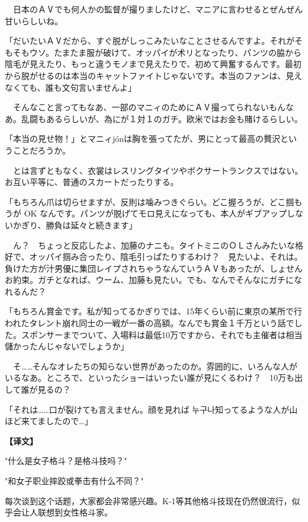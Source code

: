 \documentclass[12pt,UTF8]{ctexbook}
\begin{document}
{{　日本のＡⅤでも何人かの監督が撮りましたけど、マニアに言わせるとぜんぜん甘いらしいね。

「だいたいＡⅤだから、すぐ脱がしっこみたいなことさせるんですよ。それがそもそもウソ。たまたま服が破けて、オッパイが术リとなったり、パンツの脇から陰毛が見えたり、もっと違うモノまで見えたりで、初めて興奮するんです。最初から脱がせるのは本当のキャットファイトじゃないです。本当のファンは、見えなくても、誰も文句言いませんよ」

　そんなこと言ってもなあ、一部のマニィのためにＡⅤ撮ってられないもんなあ。乱闘もあるらしいが、為にが１対１のガチ。欧米ではお金も賭けるらしい。

「本当の見せ物！」とマニィjónは胸を張ってたが、男にとって最高の贅沢ということだろうか。

　とは言ずともなく、衣裳はレスリングタイツやボクサートランクスではない。お互い平等に、普通のスカートだったりする。

「もちろん爪は切らせますが、反則は噛みつきぐらい。どこ握ろうが、どこ掴もうが OK なんです。パンツが脱げてモロ見えになっても、本人がギブアップしないかぎり、勝負は延々と続きます」

　ん？　ちょっと反応したよ、加藤のナニも。タイトミニのＯＬさんみたいな格好で、オッパイ掴み合ったり、陰毛引っぱたりするわけ？　見たいよ、それは。負けた方が汁男優に集団レイプされちゃうなんていうＡⅤもあったが、しょせんお約束。ガチとなれば、ウーム、加藤も見たい。でも、なんでそんなにガチになれるんだ？

「もちろん賞金です。私が知ってるかぎりでは、15年くらい前に東京の某所で行われたタレント崩れ同士の一戦が一番の高額。なんでも賞金１千万という話でした。スポンサーまでついて、入場料は最低10万ですから、それでも主催者は相当儲かったんじゃないでしょうか」

　そ……そんなオレたちの知らない世界があったのか。雰囲的に、いろんな人がいるなあ。ところで、といったショーはいったい誰が見にくるわけ？　10万も出して誰が見るの？

「それは……口が裂けても言えません。顔を見れば 누구나知ってるような人が山ほど来てましたので…」
}

\vspace{2ex}
\parbox{0.9\linewidth}{
\textbf{【译文】}\par

"什么是女子格斗？是格斗技吗？"

"和女子职业摔跤或拳击有什么不同？"

每次谈到这个话题，大家都会非常感兴趣。K-1等其他格斗技现在仍然很流行，似乎会让人联想到女性格斗家。

}}
\end{document}
